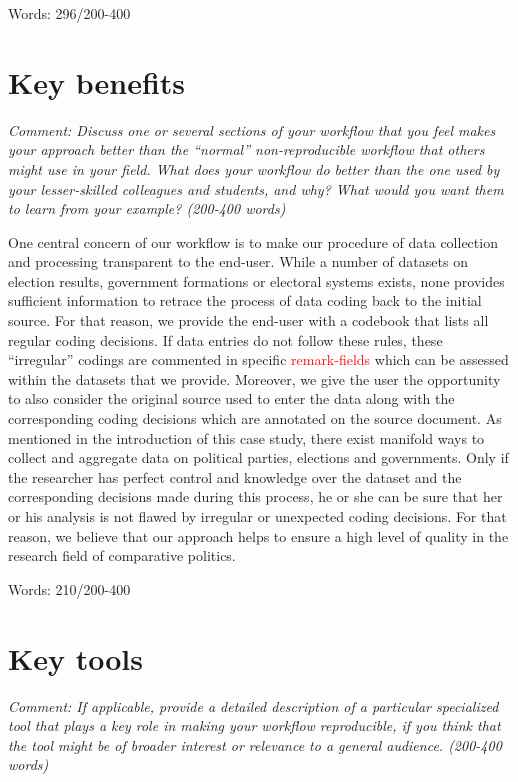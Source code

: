 \documentclass[
  11pt
]{article}
\begin{document}
\vspace*{1cm}
\noindent
Words:  296/200-400

\section{Key benefits}

\textit{Comment: Discuss one or several sections of your workflow that you feel makes your approach better than the ``normal'' non-reproducible workflow that others might use in your field. What does your workflow do better than the one used by your lesser-skilled colleagues and students, and why? What would you want them to learn from your example? (200-400 words)}

\vspace*{1cm}

\noindent
One central concern of our workflow is to make our procedure of data collection and processing transparent to the end-user. While a number of datasets on election results, government formations or electoral systems exists, none provides sufficient information to retrace the process of data coding back to the initial source. For that reason, we provide the end-user with a codebook that lists all regular coding decisions. If data entries do not follow these rules, these ``irregular'' codings are commented in specific \textcolor{red}{remark-fields} which can be assessed within the datasets that we provide. Moreover, we give the user the opportunity to also consider the original source used to enter the data along with the corresponding coding decisions which are annotated on the source document. As mentioned in the introduction of this case study, there exist manifold ways to collect and aggregate data on political parties, elections and governments. Only if the researcher has perfect control and knowledge over the dataset and the corresponding decisions made during this process, he or she can be sure that her or his analysis is not flawed by irregular or unexpected coding decisions. For that reason, we believe that our approach helps to ensure a high level of quality in the research field of comparative politics.

\vspace*{1cm}
\noindent
Words:  210/200-400

\section{Key tools}

\textit{Comment: If applicable, provide a detailed description of a particular specialized tool that plays a key role in making your workflow reproducible, if you think that the tool might be of broader interest or relevance to a general audience. (200-400 words)}
\end{document}
